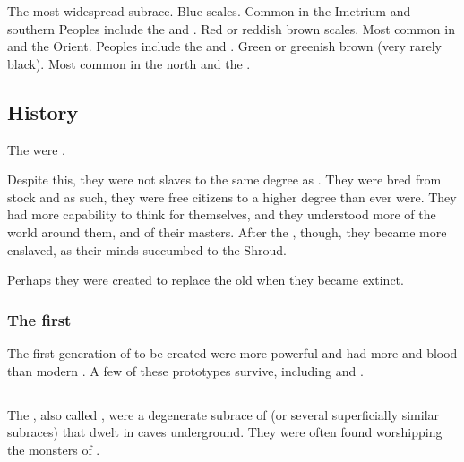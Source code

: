 \begin{gloss}
  \gitem[\Tassians]{\Tassian}
    The most widespread subrace. 
    Blue scales. 
    Common in the Imetrium and southern \Velcad{}
    Peoples include the  and . 
  \gitem[\Mekriis]{\Mekrii}
    Red or reddish brown scales.
    Most common in \Durcac and the Orient. 
    Peoples include the  and . 
  \gitem[\Lois]{\Loi}
    Green or greenish brown (very rarely black).
    Most common in the north and the \Serplands. 
\end{gloss}










\subsection{History}
The \scathae{} were . 

Despite this, they were not slaves to the same degree as \humans. 
They were bred from \naga{} stock and as such, they were free citizens to a higher degree than \humans{} ever were. 
They had more capability to think for themselves, and they understood more of the world around them, and of their masters. 
After the , though, they became more enslaved, as their minds succumbed to the Shroud.

Perhaps they were created to replace the old  when they became extinct. 





\subsubsection{The first \scathae}
The first generation of \scathae{} to be created were more powerful and had more \draconian{} and \xsic{} blood than modern \scathae. A few of these prototypes survive, including  and . 









\subsection{\Tsutoras}
\index{\tsutora}
\index{\troglodyte}
The \tsutoras, also called \troglodytes, were a degenerate subrace of \demiscathae (or several superficially similar subraces) that dwelt in caves underground. 
They were often found worshipping the \daemonic{} monsters of . 

